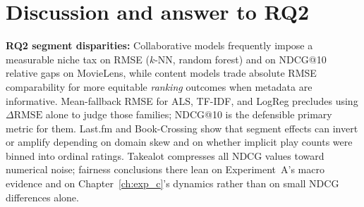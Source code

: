 \section{Discussion and answer to RQ2}
\textbf{RQ2 segment disparities:} Collaborative models frequently impose a measurable niche tax on RMSE ($k$-NN, random forest) and on NDCG@10 relative gaps on MovieLens, while content models trade absolute RMSE comparability for more equitable \emph{ranking} outcomes when metadata are informative. Mean-fallback RMSE for ALS, TF-IDF, and LogReg precludes using $\Delta\mathrm{RMSE}$ alone to judge those families; NDCG@10 is the defensible primary metric for them. Last.fm and Book-Crossing show that segment effects can invert or amplify depending on domain skew and on whether implicit play counts were binned into ordinal ratings. Takealot compresses all NDCG values toward numerical noise; fairness conclusions there lean on Experiment~A's macro evidence and on Chapter~\ref{ch:exp_c}'s dynamics rather than on small NDCG differences alone.
